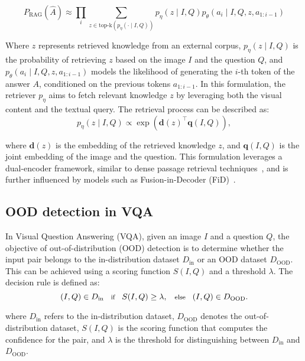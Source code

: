 \begingroup
\scriptsize
\begin{equation}
P_{\text{RAG}}(\hat{A}) \approx \prod_{i} \sum_{z \in \text{top-k}(p_\eta(\cdot \mid I, Q))} p_\eta(z \mid I, Q) p_\theta(a_i \mid I, Q, z, a_{1:i-1})
\end{equation}
\endgroup
\normalsize

Where \( z \) represents retrieved knowledge from an external corpus, \( p_\eta(z \mid I, Q) \) is the probability of retrieving \( z \) based on the image \( I \) and the question \( Q \), and \( p_\theta(a_i \mid I, Q, z, a_{1:i-1}) \) models the likelihood of generating the \( i \)-th token of the answer \( A \), conditioned on the previous tokens \( a_{1:i-1} \). In this formulation, the retriever \( p_\eta \) aims to fetch relevant knowledge \( z \) by leveraging both the visual content and the textual query. The retrieval process can be described as:
\begin{equation}
p_\eta(z \mid I, Q) \propto \exp\left(\mathbf{d}(z)^\top \mathbf{q}(I, Q)\right),
\end{equation}

where \( \mathbf{d}(z) \) is the embedding of the retrieved knowledge \( z \), and \( \mathbf{q}(I, Q) \) is the joint embedding of the image and the question. This formulation leverages a dual-encoder framework, similar to dense passage retrieval techniques~\cite{karpukhin2020dense}, and is further influenced by models such as Fusion-in-Decoder (FiD)~\cite{izacard2020leveraging}.


\subsection{OOD detection in VQA}
In Visual Question Answering (VQA), given an image \( I \) and a question \( Q \), the objective of out-of-distribution (OOD) detection is to determine whether the input pair belongs to the in-distribution dataset \( D_{\text{in}} \) or an OOD dataset \( D_{\text{OOD}} \)\cite{dong2024multiood, jiang2024negative, duong2023general, zang2024overcoming, bordes2024introduction}. This can be achieved using a scoring function \( S(I, Q) \) and a threshold \( \lambda \). The decision rule is defined as:
\begin{equation}
\footnotesize	
(I, Q) \in D_{\text{in}} \quad \text{if} \quad S(I, Q) \geq \lambda, \quad \text{else} \quad (I, Q) \in D_{\text{OOD}}.
\end{equation}

where \(D_{\text{in}}\) refers to the in-distribution dataset, \(D_{\text{OOD}}\) denotes the out-of-distribution dataset, \(S(I, Q)\) is the scoring function that computes the confidence for the pair, and \(\lambda\) is the threshold for distinguishing between \(D_{\text{in}}\) and \(D_{\text{OOD}}\). 

